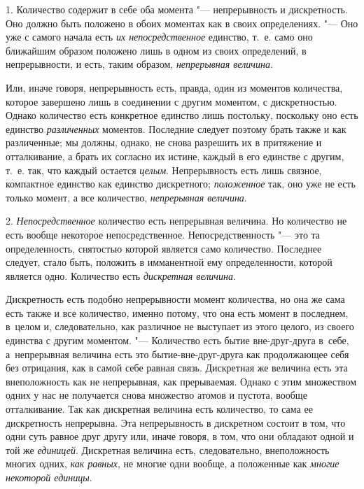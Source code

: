 
1. Количество содержит в себе оба момента "--- непрерывность и дискретность.
Оно должно быть положено в обоих моментах как в своих определениях. "--- Оно
уже с самого начала есть {\em их непосредственное} единство, т.~е. само оно
ближайшим образом положено лишь в одном из своих определений, в непрерывности,
и есть, таким образом, {\em непрерывная величина}.

Или, иначе говоря, непрерывность есть, правда, один из моментов количества,
которое завершено лишь в соединении с другим моментом, с дискретностью. Однако
количество есть конкретное единство лишь постольку, поскольку оно есть единство
{\em различенных} моментов. Последние следует поэтому брать также и как
различенные; мы должны, однако, не снова разрешить их в притяжение и
отталкивание, а брать их согласно их истине, каждый в его единстве с другим,
т.~е. так, что каждый остается {\em целым}. Непрерывность есть лишь связное,
компактное единство как единство дискретного; {\em положенное} так, оно уже не
есть только момент, а все количество, {\em непрерывная величина}.

2. {\em Непосредственное} количество есть непрерывная величина. Но количество
не есть вообще некоторое непосредственное. Непосредственность "--- это та
определенность, снятостью которой является само количество. Последнее следует,
стало быть, положить в имманентной ему определенности, которой является одно.
Количество есть {\em дискретная величина}.

Дискретность есть подобно непрерывности момент количества, но она же сама есть
также и все количество, именно потому, что она есть момент в последнем, в~целом
и, следовательно, как различное не выступает из этого целого, из своего
единства с другим моментом. "--- Количество есть бытие вне-друг-друга в~себе,
а~непрерывная величина есть это бытие-вне-друг-друга как продолжающее себя без
отрицания, как в самой себе равная связь. Дискретная же величина есть эта
внеположность как не непрерывная, как прерываемая. Однако с этим множеством
одних у нас не получается снова множество атомов и пустота, вообще
отталкивание. Так как дискретная величина есть количество, то сама ее
дискретность непрерывна. Эта непрерывность в дискретном состоит в том, что одни
суть равное друг другу или, иначе говоря, в том, что они обладают одной и той
же {\em единицей}. Дискретная величина есть, следовательно, внеположность
многих одних, {\em как равных}, не многие одни вообще, а положенные как
{\em многие некоторой единицы}.

